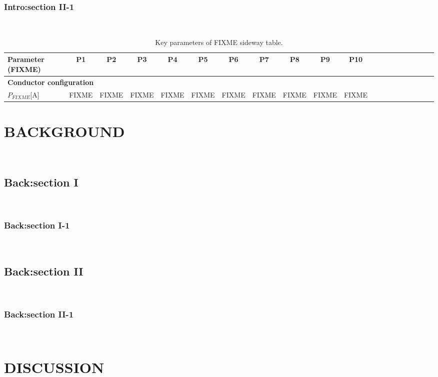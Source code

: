 \documentclass[doctor]{snuee}
\begin{document}
\subsection{Intro:section II-1}
\lipsum[1-4]~\cite{anderson1964hard}

\begin{table}
	\renewcommand{\arraystretch}{1.2}
	\setlength{\tabcolsep}{5pt}
	\centering
	\footnotesize
	\begin{tabular}{l c c c c c c c c c c c c c c c c c c c}
	\hline
	Parameter (FIXME) & P1 & P2 & P3 & P4 & P5 & P6 & P7 & P8 & P9 & P10\\
	\hline
	\multicolumn{11}{l}{\textbf{Conductor configuration}}\\
	$P_{FIXME}$\hfill[A]& FIXME & FIXME & FIXME & FIXME & FIXME & FIXME & FIXME & FIXME & FIXME & FIXME\\
	\hline
	\end{tabular}
	\caption{Key parameters of FIXME sideway table.}
	\label{tbl2-2}
\end{table}

\chapter{BACKGROUND}
\lipsum[1-4]~\cite{anderson1964hard}

\section{Back:section I}
\lipsum[1-4]~\cite{anderson1964hard}

\subsection{Back:section I-1}
\lipsum[1-4]~\cite{anderson1964hard}

\section{Back:section II}
\lipsum[1-4]~\cite{anderson1964hard}

\subsection{Back:section II-1}
\lipsum[1-4]~\cite{anderson1964hard}

\chapter{DISCUSSION}
\lipsum[1-4]~\cite{anderson1964hard}
\end{document}
